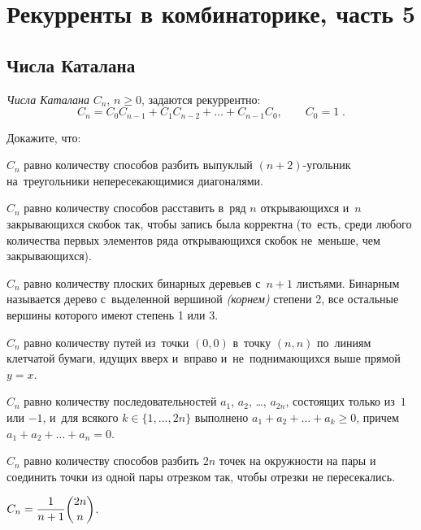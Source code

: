 

\section*{Рекурренты в комбинаторике, часть 5}



\subsection*{Числа Каталана}

\emph{Числа Каталана} $C_n$, $n \geq 0$,
задаются рекуррентно:
\[
    C_n = C_0 C_{n-1} + C_1 C_{n-2} + \ldots + C_{n-1} C_0
,\qquad
    C_0 = 1
\;.\]

Докажите, что:

\begin{problems}

\item
$C_n$ равно количеству способов разбить выпуклый $(n + 2)$-угольник
на~треугольники непересекающимися диагоналями.

\item
$C_n$ равно количеству способов расставить в~ряд $n$ открывающихся
и~$n$ закрывающихся скобок так, чтобы запись была корректна
(то~есть, среди любого количества первых элементов ряда открывающихся скобок
не~меньше, чем закрывающихся).

\item
$C_n$ равно количеству плоских бинарных деревьев с~$n + 1$ листьями.
Бинарным называется дерево с~выделенной вершиной \emph{(корнем)} степени 2,
все остальные вершины которого имеют степень 1 или 3.

\item
$C_n$ равно количеству путей из~точки $(0, 0)$ в~точку $(n, n)$ по~линиям
клетчатой бумаги, идущих вверх и~вправо и~не~поднимающихся выше прямой $y = x$.

\item
$C_n$ равно количеству последовательностей $a_1$, $a_2$, \ldots, $a_{2n}$,
состоящих только из~$1$ или $-1$, и~для всякого
$k \in \{ 1, \ldots, 2n \}$ выполнено $a_1 + a_2 + \ldots + a_k \geq 0$, причем
$a_1 + a_2 + \ldots + a_n = 0$.

\item
$C_n$ равно количеству способов разбить $2n$ точек на окружности на пары и
соединить точки из одной пары отрезком так, чтобы отрезки не пересекались.

\item
$C_n = \dfrac{1}{n + 1}\dbinom{2n}{n}$.

\end{problems}

